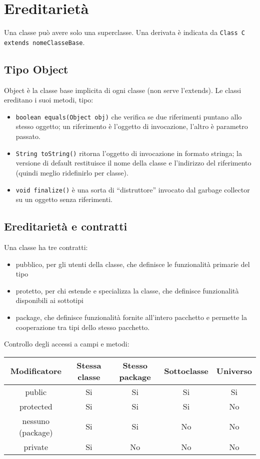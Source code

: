 \chapter{Ereditarietà}

Una classe può avere solo una superclasse. Una derivata è indicata da \texttt{Class C extends nomeClasseBase{}}. 

\section{Tipo Object}
Object è la classe base implicita di ogni classe (non serve l'extends). Le classi ereditano i suoi metodi, tipo:
\begin{itemize}
\item \texttt{boolean equals(Object obj)} che verifica se due riferimenti puntano allo stesso oggetto; un riferimento è l'oggetto di invocazione, l'altro è parametro passato. 
\item \texttt{String toString()} ritorna l'oggetto di invocazione in formato stringa; la versione di default restituisce il nome della classe e l'indirizzo del riferimento (quindi meglio ridefinirlo per classe).
\item \texttt{void finalize()} è una sorta di “distruttore” invocato dal garbage collector su un oggetto senza riferimenti.
\end{itemize}

\section{Ereditarietà e contratti}
Una classe ha tre contratti:
\begin{itemize}
\item pubblico, per gli utenti della classe, che definisce le funzionalità primarie del tipo
\item protetto, per chi estende e specializza la classe, che definisce funzionalità disponibili ai sottotipi
\item package, che definisce funzionalità fornite all'intero pacchetto e permette la cooperazione tra tipi dello stesso pacchetto.
\end{itemize}

Controllo degli accessi a campi e metodi:
\begin{table}[h]
\begin{tabular}{|c|c|c|c|c|}
\hline
Modificatore & Stessa classe & Stesso package & Sottoclasse & Universo \\
\hline
public & Si & Si & Si & Si \\
\hline
protected & Si & Si & Si & No \\
\hline
nessuno (package) & Si & Si & No & No \\
\hline
private & Si & No & No & No \\
\hline
\end{tabular}
\end{table}

